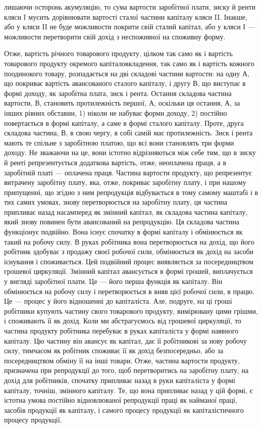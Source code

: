 \parcont{}  %
лишаючи осторонь акумуляцію, то сума вартости заробітної плати, зиску й ренти
кляси I мусить дорівнювати вартості сталої частини капіталу кляси II. Інакше,
або у кляси II не буде можливости покрити свій сталий капітал, або у кляси І —
можливости перетворити свій дохід з неспоживної на споживну форму.

Отже, вартість річного товарового продукту, цілком так само як і вартість
товарового продукту окремого капіталовкладення, так само як і вартість кожного
поодинокого товару, розпадається на дві складові частини вартости: на одну $А$, що
покриває вартість авансованого сталого капіталу, і другу $В$, що виступає в формі
доходу, як заробітна плата, зиск і рента. Остання складова частина вартости, $В$,
становить протилежність першої, $А$, оскільки ця остання, $А$, за інших рівних
обставин, 1) ніколи не набуває форми доходу, 2) постійно повертається в формі
капіталу, а саме в формі сталого капіталу. Проте, друга складова частина, $В$,
в свою чергу, в собі самій має протилежність. Зиск і рента мають те спільне з заробітною
платою, що всі вони становлять три форми доходу. Не зважаючи на це,
вони істотно відрізняються між себе тим, що в зиску й ренті репрезентується
додаткова вартість, отже, неоплачена праця, а в заробітній платі — оплачена
праця. Частина вартости продукту, що репрезентує витрачену заробітну плату,
яка, отже, покриває заробітну плату, і при нашому припущенні, що згідно з ним
репродукція відбувається в тому самому маштабі і в тих самих умовах, знову
перетворюється на заробітну плату, ця частина припливає назад насамперед
як змінний капітал, як складова частина капіталу, який знову повинен бути
авансований на репродукцію. Ця складова частина функціонує подвійно. Вона
існує спочатку в формі капіталу і обмінюється як такий на робочу силу. В руках
робітника вона перетворюється на дохід, що його робітник здобуває з продажу
своєї робочої сили, обмінюється як дохід на засоби існування і споживається.
Цей подвійний процес виявляється за посередництвом грошевої циркуляції. Змінний
капітал авансується в формі грошей, виплачується у вигляді заробітної плати.
Це — його перша функція як капіталу. Він обмінюється на робочу силу і перетворюється
в вияв цієї робочої сили, в працю. Це — процес у його відношенні до
капіталіста. Але, подруге, на ці гроші робітники купують частину свого товарового
продукту, вимірювану цими грішми, і споживають її як дохід. Коли ми
абстрагуємось від грошевої циркуляції, то частина продукту робітника перебуває
в руках капіталіста у формі наявного капіталу. Цю частину він авансує як
капітал, дає її робітникові за нову робочу силу, тимчасом як робітник споживає
її як дохід безпосередньо, або за посередництвом обміну її на інші товари.
Отже, частина вартости продукту, призначена при репродукції до того, щоб перетворитись
на заробітну плату, на дохід для робітників, спочатку припливає
назад в руки капіталіста у формі капіталу, точніш, змінного капіталу. Те, що
вона припливає назад у цій формі, є істотна умова постійно відновлюваної
репродукції праці як найманої праці, засобів продукції як капіталу, і самого
процесу продукції як капіталістичного процесу продукції.

